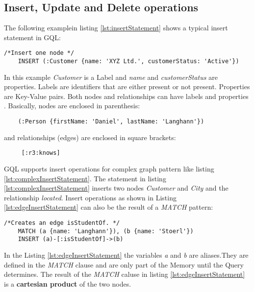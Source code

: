 \subsection{Insert, Update and Delete operations}
\label{subsec:iso:examples:insert_update_and_delete_operations}
The following examplein listing \ref{lst:insertStatement} shows a typical insert statement in GQL:
\begin{lstlisting}[caption={Typical insert statement in GQL}, label={lst:insertStatement}]
    /*Insert one node */
	INSERT (:Customer {name: 'XYZ Ltd.', customerStatus: 'Active'})
\end{lstlisting}
In this example \textit{Customer} is a Label and \textit{name} and \textit{customerStatus}
are properties.\newline
Labels are identifiers that are either present or not present.
Properties are Key-Value pairs.\newline
Both nodes and relationships can have labels and properties \citep{PINO2024100997}.
Basically, nodes are enclosed in parenthesis:
\begin{lstlisting}
	(:Person {firstName: 'Daniel', lastName: 'Langhann'})
\end{lstlisting}
and relationships (edges) are enclosed in square brackets:
\begin{lstlisting}
	 [:r3:knows]
\end{lstlisting}
GQL supports insert operations for complex graph pattern like listing \ref{lst:complexInsertStatement}.
The statement in listing \ref{lst:complexInsertStatement} inserts two nodes \textit{Customer} and
\textit{City} and the relationship \textit{located}.\newline
Insert operations as shown in Listing \ref{lst:edgeInsertStatement} can also be the result of a \textit{MATCH} pattern:
\begin{lstlisting}[caption={Pattern based insert statement}, label={lst:edgeInsertStatement}] 
	/*Creates an edge isStudentOf. */
	MATCH (a {name: 'Langhann'}), (b {name: 'Stoerl'})
	INSERT (a)-[:isStudentOf]->(b)
\end{lstlisting}
In the Listing \ref{lst:edgeInsertStatement} the variables \textit{a} and \textit{b} are
aliases.\newline They are defined in the \textit{MATCH} clause and are only part of the Memory until
the Query determines.\newline 
The result of the  \textit{MATCH} caluse in listing \ref{lst:edgeInsertStatement} is a \textbf{cartesian product} of the two nodes.

